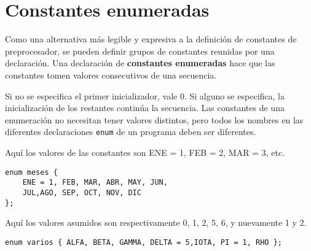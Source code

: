 \section{Constantes enumeradas}
Como una alternativa más legible y expresiva a la definición de constantes de preprocesador, se
pueden definir grupos de constantes reunidas por una declaración. Una declaración de \textbf{constantes
enumeradas} hace que las constantes tomen valores consecutivos de una secuencia. 

Si no se especifica el primer inicializador, vale 0. Si alguno se especifica, la inicialización de los
restantes continúa la secuencia. Las constantes de una enumeración no necesitan tener valores distintos, pero todos los nombres en las
diferentes declaraciones \lstinline{enum} de un programa deben ser diferentes.


\begin{ejemplo}
Aquí los valores de las constantes son ENE = 1, FEB = 2, MAR = 3, etc.
\begin{lstlisting}
enum meses { 
	ENE = 1, FEB, MAR, ABR, MAY, JUN, 
	JUL,AGO, SEP, OCT, NOV, DIC 
};
\end{lstlisting}
\end{ejemplo}
\begin{ejemplo}
Aquí los valores asumidos son respectivamente 0, 1, 2, 5, 6, y nuevamente 1 y 2.
\begin{lstlisting}
enum varios { ALFA, BETA, GAMMA, DELTA = 5,IOTA, PI = 1, RHO };	
\end{lstlisting}
\end{ejemplo}

